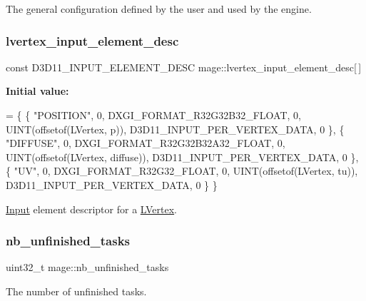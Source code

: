 The general configuration defined by the user and used by the engine. \hypertarget{namespacemage_ae6b56f20c8e8917ef1be8d9e4cef3ea3}{}\label{namespacemage_ae6b56f20c8e8917ef1be8d9e4cef3ea3} 
\subsubsection{\texorpdfstring{lvertex\+\_\+input\+\_\+element\+\_\+desc}{lvertex\_input\_element\_desc}}
{\footnotesize\ttfamily const D3\+D11\+\_\+\+I\+N\+P\+U\+T\+\_\+\+E\+L\+E\+M\+E\+N\+T\+\_\+\+D\+E\+SC mage\+::lvertex\+\_\+input\+\_\+element\+\_\+desc\mbox{[}$\,$\mbox{]}}

{\bfseries Initial value\+:}
\begin{DoxyCode}
= \{
        \{ \textcolor{stringliteral}{"POSITION"}, 0, DXGI\_FORMAT\_R32G32B32\_FLOAT, 0, UINT(offsetof(LVertex, p)), 
      D3D11\_INPUT\_PER\_VERTEX\_DATA, 0 \},
        \{ \textcolor{stringliteral}{"DIFFUSE"}, 0, DXGI\_FORMAT\_R32G32B32A32\_FLOAT, 0, UINT(offsetof(LVertex, diffuse)), 
      D3D11\_INPUT\_PER\_VERTEX\_DATA, 0 \},
        \{ \textcolor{stringliteral}{"UV"}, 0, DXGI\_FORMAT\_R32G32\_FLOAT, 0, UINT(offsetof(LVertex, tu)), D3D11\_INPUT\_PER\_VERTEX\_DATA, 0
       \}
    \}
\end{DoxyCode}
\hyperlink{classmage_1_1_input}{Input} element descriptor for a \hyperlink{structmage_1_1_l_vertex}{L\+Vertex}. \hypertarget{namespacemage_a390e8652d67667609daf3aa64e3c00a8}{}\label{namespacemage_a390e8652d67667609daf3aa64e3c00a8} 
\subsubsection{\texorpdfstring{nb\+\_\+unfinished\+\_\+tasks}{nb\_unfinished\_tasks}}
{\footnotesize\ttfamily uint32\+\_\+t mage\+::nb\+\_\+unfinished\+\_\+tasks\hspace{0.3cm}{\ttfamily [static]}}

The number of unfinished tasks. \hypertarget{namespacemage_af4824558d428695e4661c5e7cdfa4419}{}\label{namespacemage_af4824558d428695e4661c5e7cdfa4419} 

